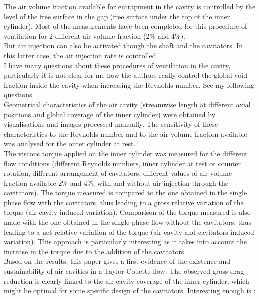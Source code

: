 \documentclass[10pt]{article}
\begin{document}
{The air volume fraction available for entrapment in the cavity is controlled by the level of the free surface in the gap (free surface under the top of the inner cylinder). Most of the measurements have been completed for this procedure of ventilation for 2 different air volume fraction (2\% and 4\%).\vspace{\baselineskip}\\
But air injection can also be activated though the shaft and the cavitators. In this latter case, the air injection rate is controlled. \vspace{\baselineskip}\\
I have many questions about these procedures of ventilation in the cavity, particularly it is not clear for me how the authors really control the global void fraction inside the cavity when increasing the Reynolds number. See my following questions. \vspace{\baselineskip}\\
 Geometrical characteristics of the air cavity (streamwise length at different axial positions and global coverage of the inner cylinder) were obtained by visualisations and images processed manually. The sensitivity of these characteristics to the Reynolds number and to the air volume fraction available was analysed for the outer cylinder at rest. \vspace{\baselineskip}\\
 The viscous torque applied on the inner cylinder was measured for the different flow conditions (different Reynolds numbers, inner cylinder at rest or counter rotation, different arrangement of cavitators, different values of air volume fraction available 2\% and 4\%, with and without air injection through the cavitators). The torque measured is compared to the one obtained in the single phase flow with the cavitators, thus leading to a gross relative variation of the torque (air cavity induced variation). Comparison of the torque measured is also made with the one obtained in the single phase flow without the cavitators, thus leading to a net relative variation of the torque (air cavity and cavitators induced variation). This approach is particularly interesting as it takes into account the increase in the torque due to the addition of the cavitators. \vspace{\baselineskip}\\
 Based on the results,  this paper gives a first evidence of the existence and sustainability of air cavities in a Taylor Couette flow. The observed gross drag reduction is clearly linked to the air cavity coverage of the inner cylinder, which might be optimal for some specific design of the cavitators. Interesting enough is : \vspace{\baselineskip}\\
}
\end{document}
